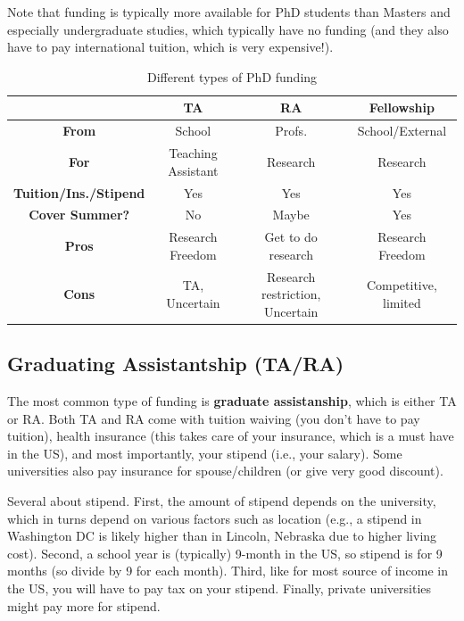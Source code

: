 \documentclass[11pt]{article}
\begin{document}
Note that funding is typically more available for PhD students than 
Masters and especially undergraduate studies, which typically have no funding (and they also have to pay international tuition, which is very expensive!).  

\begin{table}
  \centering
  \footnotesize
  \caption{Different types of PhD funding}\label{tab:funding}
  \begin{tabular}{c|c|c|c}
    \toprule
    &\textbf{TA}&\textbf{RA}&\textbf{Fellowship}\\
    \midrule
    \textbf{From} & School & Profs. & School/External\\
    \textbf{For}                  & Teaching Assistant       & Research                        & Research                              \\
    \textbf{Tuition/Ins./Stipend} & Yes                      & Yes                             & Yes                                   \\
    \textbf{Cover Summer?}              & No                       & Maybe                           & Yes                                   \\
    \midrule
    \textbf{Pros}                 & Research Freedom         & Get to do research              & Research Freedom                      \\
    \textbf{Cons}                 & TA, Uncertain            & Research restriction, Uncertain & Competitive, limited             \\
    \bottomrule
  \end{tabular}
\end{table}

\subsection{Graduating Assistantship (TA/RA)}
The most common type of funding is \textbf{graduate assistanship}, which is either TA or RA. Both TA and RA come with tuition waiving (you don't have to pay tuition), health insurance (this takes care of your insurance, which is a must have in the US), and most importantly, your stipend (i.e., your salary). Some universities also pay insurance for spouse/children (or give very good discount).

Several about stipend. First, the amount of stipend depends on the university, which in turns depend on various factors such as location (e.g., a stipend in Washington DC is likely higher than in Lincoln, Nebraska due to higher living cost). Second, a school year is (typically) 9-month in the US, so stipend is for 9 months (so divide by 9 for each month). Third, like for most source of income in the US, you will have to pay tax on your stipend. Finally, private universities might pay more for stipend.
\end{document}
